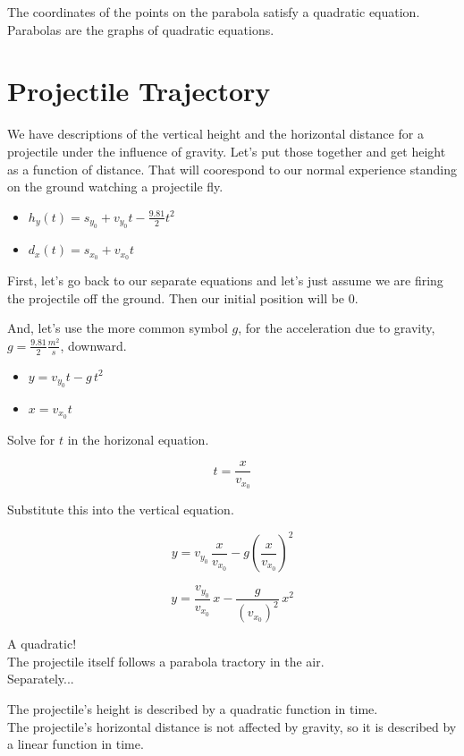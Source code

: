\documentclass{ximera}
\begin{document}
The coordinates of the points on the parabola satisfy a quadratic equation.  Parabolas are the graphs of quadratic equations.












\section{Projectile Trajectory}


We have descriptions of the vertical height and the horizontal distance for a projectile under the influence of gravity.  Let's put those together and get height as a function of distance.  That will coorespond to our normal experience standing on the ground watching a projectile fly.


\begin{itemize}
\item $h_y(t) = s_{y_0} + v_{y_0} t - \frac{9.81}{2} t^2$


\item $d_x(t) = s_{x_0} + v_{x_0} t$
\end{itemize}




First, let's go back to our separate equations and let's just assume we are firing the projectile off the ground.  Then our initial position will be $0$.  

And, let's use the more common symbol $g$, for the acceleration due to gravity, $g = \frac{9.81}{2} \frac{m^2}{s}$, downward.




\begin{itemize}
\item $y = v_{y_0} t - g \, t^2$


\item $x = v_{x_0} t$
\end{itemize}


Solve for $t$ in the horizonal equation.


\[ t = \frac{x}{v_{x_0}} \]

Substitute this into the vertical equation.


\[  y = v_{y_0} \, \frac{x}{v_{x_0}} - g \left(\frac{x}{v_{x_0}}\right)^2  \]



\[  y = \frac{v_{y_0}}{v_{x_0}} \, x  - \frac{g}{(v_{x_0})^2} \, x^2 \]



A quadratic! \\

The projectile itself follows a parabola tractory in the air. \\


Separately...


The projectile's height is described by a quadratic function in time. \\


The projectile's horizontal distance is not affected by gravity, so it is described by a linear function in time. \\
\end{document}

